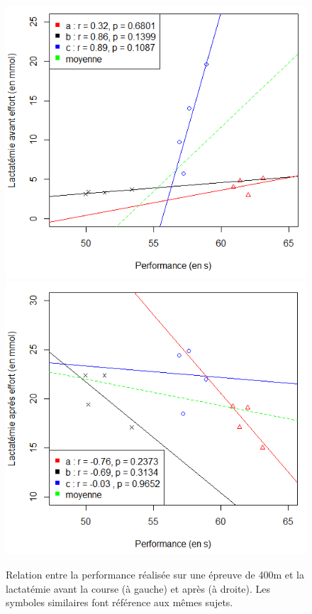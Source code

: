             \begin{figure}[H]
                    \centering
                    \includegraphics[scale=0.6]{images/lact_perf_av_moy}
                    \hfill
                    \includegraphics[scale=0.6]{images/lact_perf_ap_moy}
                    \caption{\label{fig:lact_perf_av_ap}Relation entre la performance réalisée sur une épreuve de 400m et la lactatémie avant la course (à gauche) et après (à droite). Les symboles similaires font référence aux mêmes sujets.}
            \end{figure}
            
